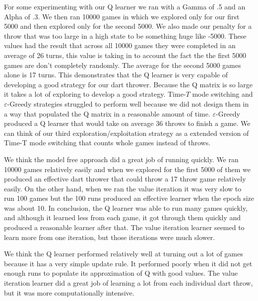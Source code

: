 \documentclass[solution, letterpaper]{cs121}
\begin{document}
For some experimenting with our Q learner we ran with a Gamma of .5 and an Alpha of .3. We then ran 10000 games in which we explored only for our first 5000 and then explored only for the second 5000. We also made our penalty for a throw that was too large in a high state to be something huge like -5000. These values had the result that across all 10000 games they were completed in an average of 26 turns, this value is taking in to account the fact the the first 5000 games are don't completely randomly. The average for the second 5000 games alone is 17 turns. This demonstrates that the Q learner is very capable of developing a good strategy for our dart thrower. Because the Q matrix is so large it takes a lot of exploring to develop a good strategy. Time-$T$ mode switching and $\varepsilon$-Greedy strategies struggled to perform well because we did not design them in a way that populated the Q matrix in a reasonable amount of time. $\varepsilon$-Greedy produced a Q learner that would take on average 36 throws to finish a game. We can think of our third exploration/exploitation strategy as a extended version of Time-T mode switching that counts whole games instead of throws. 

\subproblem{} %
We think the model free approach did a great job of running quickly. We ran 10000 games relatively easily and when we explored for the first 5000 of them we produced an effective dart thrower that could throw a 17 throw game relatively easily. 
On the other hand, when we ran the value iteration it was very slow to run 100 games but the 100 runs produced an effective learner when the epoch size was about 10.  
In conclusion, the Q learner was able to run many games quickly, and although it learned less from each game, it got through them quickly and produced a reasonable learner after that. The value iteration learner seemed to learn more from one iteration, but those iterations were much slower.

We think the Q learner performed relatively well at turning out a lot of games because it has a very simple update rule. It performed poorly when it did not get enough runs to populate its approximation of Q with good values.
The value iteration learner did a great job of learning a lot from each individual dart throw, but it was more computationally intensive. 
\end{document}
